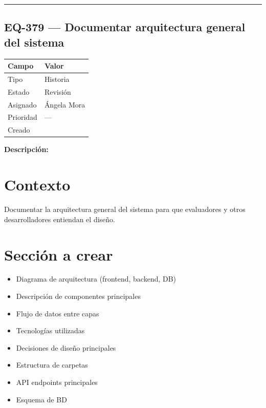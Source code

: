 \documentclass[
  spanish,
  11pt,
]{report}
\newcounter{none} %
\providecommand{\tightlist}{%
  \setlength{\itemsep}{0pt}\setlength{\parskip}{0pt}}
\begin{document}
\begin{center}\rule{0.5\linewidth}{0.5pt}\end{center}

\subsection{EQ-379 --- Documentar arquitectura general del
sistema}\label{eq-379-documentar-arquitectura-general-del-sistema}

{\def\LTcaptype{none} %
\begin{longtable}[]{@{}ll@{}}
\toprule\noalign{}
Campo & Valor \\
\midrule\noalign{}
\endhead
\bottomrule\noalign{}
\endlastfoot
Tipo & Historia \\
Estado & Revisión \\
Asignado & Ángela Mora \\
Prioridad & --- \\
Creado & \\
\end{longtable}
}

\textbf{Descripción:}

\section{Contexto}\label{contexto-17}

Documentar la arquitectura general del sistema para que evaluadores y
otros desarrolladores entiendan el diseño.

\section{Sección a crear}\label{secciuxf3n-a-crear}

\begin{itemize}
\tightlist
\item
  Diagrama de arquitectura (frontend, backend, DB)
\item
  Descripción de componentes principales
\item
  Flujo de datos entre capas
\item
  Tecnologías utilizadas
\item
  Decisiones de diseño principales
\item
  Estructura de carpetas
\item
  API endpoints principales
\item
  Esquema de BD
\end{itemize}
\end{document}
